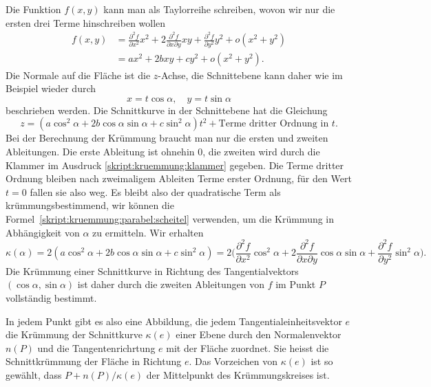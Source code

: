 Die Funktion $f(x,y)$ kann man als Taylorreihe schreiben, wovon wir nur
die ersten drei Terme hinschreiben wollen
\begin{align*}
f(x,y)
&=
\frac{\partial^2 f}{\partial x^2}x^2
+
2\frac{\partial^2 f}{\partial x\partial y}xy
+
\frac{\partial^2 f}{\partial y^2}y^2
+
o(x^2+y^2)
\\
&=
ax^2 + 2bxy + cy^2 + o(x^2+y^2).
\end{align*}
Die Normale auf die Fläche ist die $z$-Achse, die Schnittebene kann
daher wie im Beispiel wieder durch
\[
x=t\cos\alpha,\quad y=t\sin\alpha
\]
beschrieben werden.
Die Schnittkurve in der Schnittebene hat die Gleichung
\begin{equation}
z
=
(a\cos^2\alpha + 2b\cos\alpha\sin\alpha  + c\sin^2\alpha)t^2
+
\text{Terme dritter Ordnung in $t$}.
\label{skript:kruemmung:klammer}
\end{equation}
Bei der Berechnung der Krümmung braucht man nur die ersten und zweiten
Ableitungen. 
Die erste Ableitung ist ohnehin $0$, die zweiten wird durch die Klammer
im Ausdruck \eqref{skript:kruemmung:klammer} gegeben.
Die Terme dritter Ordnung bleiben nach zweimaligem Ableiten Terme erster
Ordnung, für den Wert $t=0$ fallen sie also weg.
Es bleibt also der quadratische Term als krümmungsbestimmend, wir
können die Formel~\eqref{skript:kruemmung:parabel:scheitel} verwenden, um die
Krümmung in Abhängigkeit von $\alpha$ zu ermitteln.
Wir erhalten
\[
\kappa(\alpha)
=
2(a\cos^2\alpha + 2b\cos\alpha\sin\alpha + c\sin^2 \alpha)
=
2\biggl(
\frac{\partial^2 f}{\partial x^2}\cos^2\alpha
+
2\frac{\partial^2 f}{\partial x\partial y}\cos\alpha\sin\alpha
+
\frac{\partial^2 f}{\partial y^2}\sin^2 \alpha
\biggr).
\]
Die Krümmung einer Schnittkurve in Richtung des Tangentialvektors
$(\cos\alpha,\sin\alpha)$ ist daher durch die zweiten Ableitungen von
$f$ im Punkt $P$ vollständig bestimmt.

\begin{definition}
In jedem Punkt gibt es also eine Abbildung, die jedem
Tangentialeinheitsvektor $e$
die Krümmung der Schnittkurve $\kappa(e)$ einer Ebene durch den Normalenvektor
$n(P)$ und die Tangentenrichrtung $e$ mit der Fläche zuordnet.
Sie heisst die Schnittkrümmung der Fläche in Richtung $e$.
Das Vorzeichen von $\kappa(e)$ ist so gewählt, dass $P+n(P)/\kappa(e)$ der
Mittelpunkt des Krümmungskreises ist.
\end{definition}
